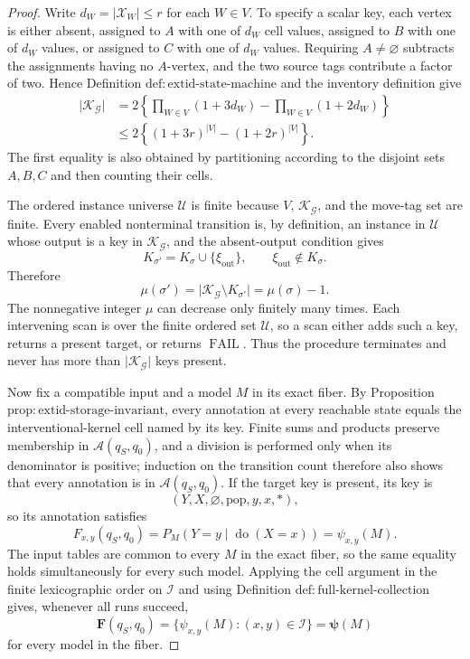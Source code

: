 \documentclass{article}
\begin{document}
\begin{proof}
Write \(d_W=\lvert\mathcal X_W\rvert\leq r\) for each \(W\in V\).  To specify a scalar key, each vertex is either absent, assigned to \(A\) with one of \(d_W\) cell values, assigned to \(B\) with one of \(d_W\) values, or assigned to \(C\) with one of \(d_W\) values.  Requiring \(A\neq\varnothing\) subtracts the assignments having no \(A\)-vertex, and the two source tags contribute a factor of two.  Hence Definition \(\mathrm{def{:}extid\text{-}state\text{-}machine}\) and the inventory definition give
\[
 \begin{aligned}
 \lvert\mathscr K_{\mathcal G}\rvert
 &=2\left\{\prod_{W\in V}(1+3d_W)-\prod_{W\in V}(1+2d_W)\right\}\\
 &\leq2\left\{(1+3r)^{\lvert V\rvert}-(1+2r)^{\lvert V\rvert}\right\}.
 \end{aligned}
\]
The first equality is also obtained by partitioning according to the disjoint sets \(A,B,C\) and then counting their cells.

The ordered instance universe \(\mathscr U\) is finite because \(V\), \(\mathscr K_{\mathcal G}\), and the move-tag set are finite.  Every enabled nonterminal transition is, by definition, an instance in \(\mathscr U\) whose output is a key in \(\mathscr K_{\mathcal G}\), and the absent-output condition gives
\[
 K_{\sigma'}=K_\sigma\cup\{\xi_{\mathrm{out}}\},
 \qquad \xi_{\mathrm{out}}\notin K_\sigma.
\]
Therefore
\[
 \mu(\sigma')
 =\lvert\mathscr K_{\mathcal G}\setminus K_{\sigma'}\rvert
 =\mu(\sigma)-1.
\]
The nonnegative integer \(\mu\) can decrease only finitely many times.  Each intervening scan is over the finite ordered set \(\mathscr U\), so a scan either adds such a key, returns a present target, or returns \(\operatorname{FAIL}\).  Thus the procedure terminates and never has more than \(\lvert\mathscr K_{\mathcal G}\rvert\) keys present.

Now fix a compatible input and a model \(M\) in its exact fiber.  By Proposition \(\mathrm{prop{:}extid\text{-}storage\text{-}invariant}\), every annotation at every reachable state equals the interventional-kernel cell named by its key.  Finite sums and products preserve membership in \(\mathcal A(q_S,q_0)\), and a division is performed only when its denominator is positive; induction on the transition count therefore also shows that every annotation is in \(\mathcal A(q_S,q_0)\).  If the target key is present, its key is
\[
 (Y,X,\varnothing,\mathrm{pop},y,x,\ast),
\]
so its annotation satisfies
\[
 F_{x,y}(q_S,q_0)
 =P_M(Y=y\mid\operatorname{do}(X=x))
 =\psi_{x,y}(M).
\]
The input tables are common to every \(M\) in the exact fiber, so the same equality holds simultaneously for every such model.  Applying the cell argument in the finite lexicographic order on \(\mathcal I\) and using Definition \(\mathrm{def{:}full\text{-}kernel\text{-}collection}\) gives, whenever all runs succeed,
\[
 \mathbf F(q_S,q_0)=\{\psi_{x,y}(M):(x,y)\in\mathcal I\}
 =\boldsymbol\psi(M)
\]
for every model in the fiber.
\end{proof}
\end{document}
